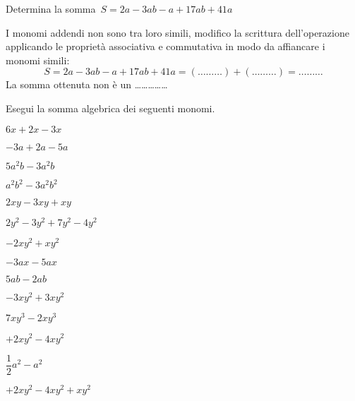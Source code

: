 \begin{esercizio}
\label{ese:9.25}
Determina la somma~\(S=2a-3ab-a+17ab+41a\)

I monomi addendi non sono tra loro simili, modifico la scrittura
dell'operazione applicando le proprietà associativa e commutativa
in modo da affiancare i monomi simili:
\[
S=2a-3ab-a+17ab+41a=(\ldots\ldots\ldots)+
(\ldots\ldots\ldots)=\ldots\ldots\ldots\]
La somma ottenuta non è un \ldots\ldots\ldots\ldots\ldots
\end{esercizio}

\begin{esercizio}
\label{ese:9.26}
Esegui la somma algebrica dei seguenti monomi.
\begin{htmulticols}{3}
\begin{enumeratea}
\spazielenx
\item \(6x+2x-3x\)
\item \(-3a+2a-5a\)
\item \(5a^{2}b-3a^{2}b\)
\item \(a^{2}b^{2}-3a^{2}b^{2}\)
\item \(2xy-3xy+xy\)
\item \(2y^{2}-3y^{2}+7y^{2}-4y^{2}\)
% 
\spazielenx
\item \(-2xy^{2}+xy^{2}\)
\item \(-3ax-5ax\)
\item \(5ab-2ab\)
\item \(-3xy^{2}+3xy^{2}\)
\item \(7xy^{3}-2xy^{3}\)
\item \(+2xy^{2}-4xy^{2}\)
% 
\spazielenx
\item \(\dfrac{1}{2}a^{2}-a^{2}\)
\item \(+2xy^{2}-4xy^{2}+xy^{2}\)

\end{enumeratea}
\end{htmulticols}
\end{esercizio}
